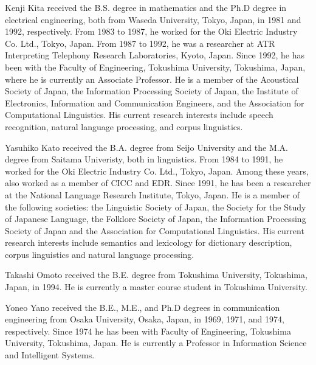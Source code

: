 \begin{biography}

\biotitle{}

{
Kenji Kita received the B.S. degree in mathematics 
and the Ph.D degree in electrical engineering,
both from Waseda University,
Tokyo, Japan, in 1981 and 1992, respectively.
From 1983 to 1987, he worked for the Oki Electric Industry Co. Ltd., Tokyo, Japan.
From 1987 to 1992,
he was a researcher at ATR Interpreting Telephony
Research Laboratories, Kyoto, Japan.
Since 1992, he has been with the Faculty of Engineering,
Tokushima University, Tokushima, Japan,
where he is currently an Associate Professor.
He is a member of the Acoustical Society of Japan,
the Information Processing Society of Japan,
the Institute of Electronics, Information and Communication Engineers,
and the Association for Computational Linguistics.
His current research interests include speech recognition,
natural language processing, and corpus linguistics.
}

{
Yasuhiko Kato received the B.A. degree from Seijo University and the M.A. degree
from Saitama Univeristy, both in linguistics.
From 1984 to 1991, he worked for the Oki Electric Industry Co. Ltd., Tokyo, Japan.
Among these years, also worked as a member of CICC and EDR.
Since 1991, he has been a researcher at the National Language Research Institute,
Tokyo, Japan.
He is a member of the following societies:
the Linguistic Society of Japan, the Society for the Study of Japanese Language,
the Folklore Society of Japan, the Information Processing Society of Japan and
the Association for Computational Linguistics.
His current research interests include semantics and lexicology for dictionary
description, corpus linguistics and natural language processing.
}

{
Takashi Omoto received the B.E. degree from Tokushima University, Tokushima, Japan, in 1994.
He is currently a master course student in Tokushima University.
}

{
Yoneo Yano received the B.E., M.E., and Ph.D degrees in communication engineering
from Osaka University, Osaka, Japan, in 1969, 1971, and 1974, respectively.
Since 1974 he has been with Faculty of Engineering, Tokushima University, Tokushima, Japan.
He is currently a Professor in Information Science and Intelligent Systems.
}


\end{biography}



